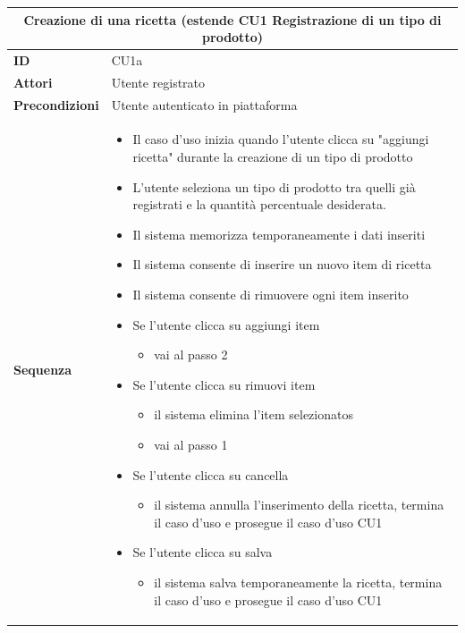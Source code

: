 \documentclass[a4paper,11pt]{article}
\begin{document}
\begin{table}[H]
  \centering
  \begin{tabular}{|m{2cm}|m{10.5cm}|}
    \hline
    \multicolumn{2}{|c|}{\textbf{Creazione di una ricetta (estende CU1 Registrazione di un tipo di prodotto)}}                                                      \\ \hline
    \multicolumn{1}{|l|}{\textbf{ID}}              & CU1a                                                                                                           \\ \hline
    \multicolumn{1}{|l|}{\textbf{Attori}}          & Utente registrato                                                                                              \\ \hline
    \multicolumn{1}{|l|}{\textbf{Precondizioni}}   & Utente autenticato in piattaforma                                                                              \\ \hline
    \multicolumn{1}{|l|}{\textbf{Sequenza}}        &

    \begin{itemize}
      \item Il caso d'uso inizia quando l'utente clicca su "aggiungi ricetta" durante la creazione di un tipo di prodotto
      \item L'utente seleziona un tipo di prodotto tra quelli già registrati e la quantità percentuale desiderata.
      \item Il sistema memorizza temporaneamente i dati inseriti
      \item Il sistema consente di inserire un nuovo item di ricetta
      \item Il sistema consente di rimuovere ogni item inserito
      \item Se l'utente clicca su aggiungi item
            \begin{itemize}
              \item vai al passo 2
            \end{itemize}
      \item Se l'utente clicca su rimuovi item
            \begin{itemize}
              \item il sistema elimina l'item selezionatos
              \item vai al passo 1
            \end{itemize}
      \item Se l'utente clicca su cancella
            \begin{itemize}
              \item il sistema annulla l'inserimento della ricetta, termina il caso d'uso e prosegue il caso d'uso CU1
            \end{itemize}
      \item Se l'utente clicca su salva
            \begin{itemize}
              \item il sistema salva temporaneamente la ricetta, termina il caso d'uso e prosegue il caso d'uso CU1
            \end{itemize}
    \end{itemize}


\end{tabular}
\end{table}
\end{document}
